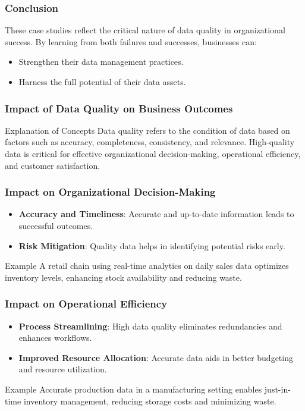 \documentclass{beamer}
\begin{document}
\begin{frame}[fragile]
    \frametitle{Conclusion}
    These case studies reflect the critical nature of data quality in organizational success. 
    By learning from both failures and successes, businesses can:
    \begin{itemize}
        \item Strengthen their data management practices.
        \item Harness the full potential of their data assets.
    \end{itemize}
\end{frame}

\begin{frame}[fragile]
    \frametitle{Impact of Data Quality on Business Outcomes}
    \begin{block}{Explanation of Concepts}
        Data quality refers to the condition of data based on factors such as accuracy, completeness, consistency, and relevance. High-quality data is critical for effective organizational decision-making, operational efficiency, and customer satisfaction.
    \end{block}
\end{frame}

\begin{frame}[fragile]
    \frametitle{Impact on Organizational Decision-Making}
    \begin{itemize}
        \item \textbf{Accuracy and Timeliness}: Accurate and up-to-date information leads to successful outcomes.
        \item \textbf{Risk Mitigation}: Quality data helps in identifying potential risks early.
    \end{itemize}
    \begin{block}{Example}
        A retail chain using real-time analytics on daily sales data optimizes inventory levels, enhancing stock availability and reducing waste.
    \end{block}
\end{frame}

\begin{frame}[fragile]
    \frametitle{Impact on Operational Efficiency}
    \begin{itemize}
        \item \textbf{Process Streamlining}: High data quality eliminates redundancies and enhances workflows.
        \item \textbf{Improved Resource Allocation}: Accurate data aids in better budgeting and resource utilization.
    \end{itemize}
    \begin{block}{Example}
        Accurate production data in a manufacturing setting enables just-in-time inventory management, reducing storage costs and minimizing waste.
    \end{block}
\end{frame}
\end{document}
